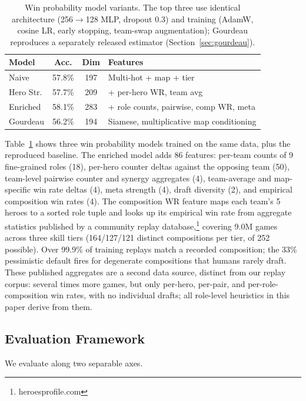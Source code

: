 \documentclass[journal]{IEEEtran}
\begin{document}
\begin{table}[t]
\centering
\caption{Win probability model variants. The top three use identical architecture (256$\to$128 MLP, dropout 0.3) and training (AdamW, cosine LR, early stopping, team-swap augmentation); Gourdeau reproduces a separately released estimator (Section~\ref{sec:gourdeau}).}
\label{tab:models}
\begin{tabular}{lccp{3.2cm}}
\toprule
Model & Acc. & Dim & Features \\
\midrule
Naive & 57.8\% & 197 & Multi-hot + map + tier \\
Hero Str. & 57.7\% & 209 & + per-hero WR, team avg \\
Enriched & 58.1\% & 283 & + role counts, pairwise, comp WR, meta \\
\midrule
Gourdeau & 56.2\% & 194 & Siamese, multiplicative map conditioning \\
\bottomrule
\end{tabular}
\end{table}

Table~\ref{tab:models} shows three win probability models trained on the same data, plus the reproduced baseline. The enriched model adds 86 features: per-team counts of 9 fine-grained roles (18), per-hero counter deltas against the opposing team (50), team-level pairwise counter and synergy aggregates (4), team-average and map-specific win rate deltas (4), meta strength (4), draft diversity (2), and empirical composition win rates (4). The composition WR feature maps each team's 5 heroes to a sorted role tuple and looks up its empirical win rate from aggregate statistics published by a community replay database,\footnote{heroesprofile.com} covering 9.0M games across three skill tiers (164/127/121 distinct compositions per tier, of 252 possible). Over 99.9\% of training replays match a recorded composition; the 33\% pessimistic default fires for degenerate compositions that humans rarely draft. These published aggregates are a second data source, distinct from our replay corpus: several times more games, but only per-hero, per-pair, and per-role-composition win rates, with no individual drafts; all role-level heuristics in this paper derive from them.

\subsection{Evaluation Framework}
\label{sec:eval}

We evaluate along two separable axes.
\end{document}
